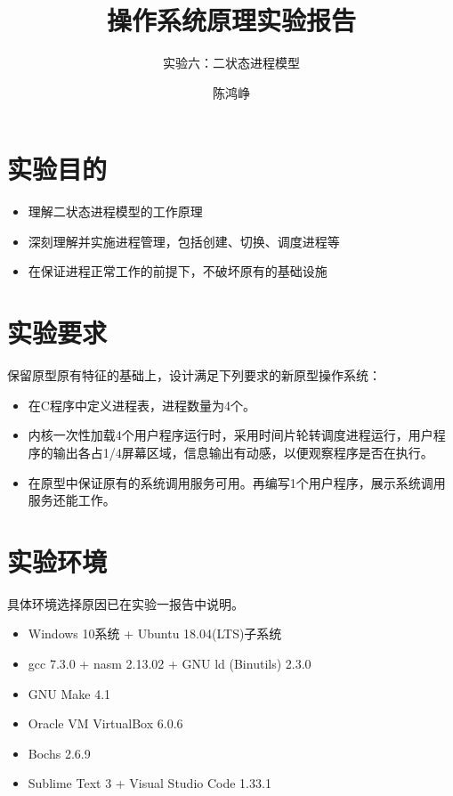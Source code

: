 \documentclass[logo,reportComp]{thesis}
\title{操作系统原理实验报告}
\subtitle{实验六：二状态进程模型}
\author{陈鸿峥}
\begin{document}
\maketitle

\section{实验目的}
\begin{itemize}
	\item 理解二状态进程模型的工作原理
	\item 深刻理解并实施进程管理，包括创建、切换、调度进程等
	\item 在保证进程正常工作的前提下，不破坏原有的基础设施
\end{itemize}

\section{实验要求}
保留原型原有特征的基础上，设计满足下列要求的新原型操作系统：
\begin{itemize}
	\item 在C程序中定义进程表，进程数量为4个。
	\item 内核一次性加载4个用户程序运行时，采用时间片轮转调度进程运行，用户程序的输出各占1/4屏幕区域，信息输出有动感，以便观察程序是否在执行。
	\item 在原型中保证原有的系统调用服务可用。再编写1个用户程序，展示系统调用服务还能工作。
\end{itemize}

\section{实验环境}
具体环境选择原因已在实验一报告中说明。
\begin{itemize}
	\item Windows 10系统 + Ubuntu 18.04(LTS)子系统
	\item gcc 7.3.0 + nasm 2.13.02 + GNU ld (Binutils) 2.3.0
    \item GNU Make 4.1
	\item Oracle VM VirtualBox 6.0.6
    \item Bochs 2.6.9
	\item Sublime Text 3 + Visual Studio Code 1.33.1
\end{itemize}
\end{document}
